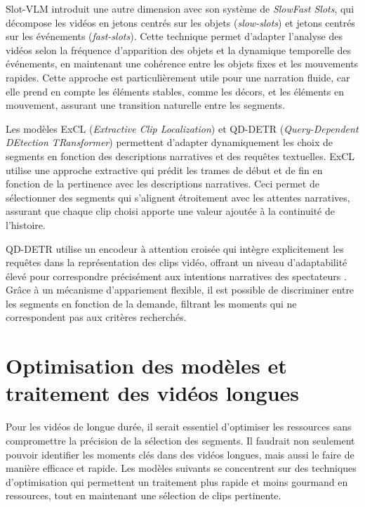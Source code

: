 Slot-VLM  \cite{xu2024} introduit une autre dimension avec son système de \textit{SlowFast Slots}, qui décompose les vidéos en jetons centrés sur les objets (\textit{slow-slots}) et jetons centrés sur les événements (\textit{fast-slots}). Cette technique permet d’adapter l’analyse des vidéos selon la fréquence d’apparition des objets et la dynamique temporelle des événements, en maintenant une cohérence entre les objets fixes et les mouvements rapides. Cette approche est particulièrement utile pour une narration fluide, car elle prend en compte les éléments stables, comme les décors, et les éléments en mouvement, assurant une transition naturelle entre les segments.

Les modèles ExCL (\textit{Extractive Clip Localization}) \cite{ghosh2019_excl} et QD-DETR (\textit{Query-Dependent DEtection TRansformer}) \cite{sun2023_gptsee} permettent d’adapter dynamiquement les choix de segments en fonction des descriptions narratives et des requêtes textuelles. ExCL utilise une approche extractive qui prédit les trames de début et de fin en fonction de la pertinence avec les descriptions narratives. Ceci permet de sélectionner des segments qui s’alignent étroitement avec les attentes narratives, assurant que chaque clip choisi apporte une valeur ajoutée à la continuité de l’histoire.

QD-DETR utilise un encodeur à attention croisée qui intègre explicitement les requêtes dans la représentation des clips vidéo, offrant un niveau d’adaptabilité élevé pour correspondre précisément aux intentions narratives des spectateurs \cite{lei2021_moments}. Grâce à un mécanisme d’appariement flexible, il est possible de discriminer entre les segments en fonction de la demande, filtrant les moments qui ne correspondent pas aux critères recherchés.

\section{Optimisation des modèles et traitement des vidéos longues}

Pour les vidéos de longue durée, il serait essentiel d’optimiser les ressources sans compromettre la précision de la sélection des segments. Il faudrait non seulement pouvoir identifier les moments clés dans des vidéos longues, mais aussi le faire de manière efficace et rapide. Les modèles suivants se concentrent sur des techniques d’optimisation qui permettent un traitement plus rapide et moins gourmand en ressources, tout en maintenant une sélection de clips pertinente.

